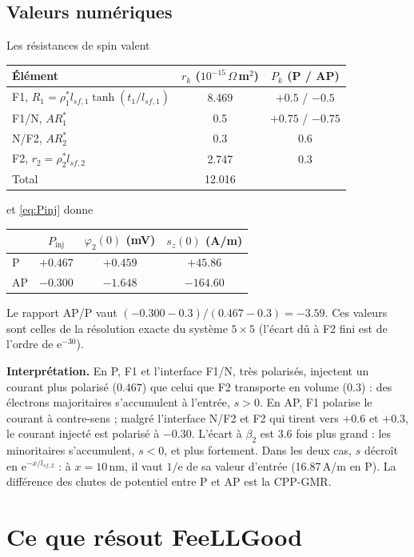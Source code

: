 \documentclass[11pt,a4paper]{article}
\newcommand{\ee}{\mathrm{e}}
\begin{document}
\subsection{Valeurs numériques}

Les résistances de spin valent
\begin{center}
\begin{tabular}{lcc}
  \toprule
  Élément & $r_k$ ($10^{-15}\,\Omega\,$m$^2$) & $P_k$ (P / AP) \\
  \midrule
  F1, $R_1 = \rho_1^*l_{sf,1}\tanh(t_1/l_{sf,1})$ & 8.469 & $+0.5$ / $-0.5$ \\
  F1/N, $AR_1^*$ & 0.5 & $+0.75$ / $-0.75$ \\
  N/F2, $AR_2^*$ & 0.3 & 0.6 \\
  F2, $r_2 = \rho_2^*l_{sf,2}$ & 2.747 & 0.3 \\
  \midrule
  Total & 12.016 & \\
  \bottomrule
\end{tabular}
\end{center}
et \eqref{eq:Pinj} donne
\begin{center}
\renewcommand{\arraystretch}{1.2}
\begin{tabular}{lccc}
  \toprule
  & $P_{\mathrm{inj}}$ & $\varphi_2(0)$ (mV) & $s_z(0)$ (A/m) \\
  \midrule
  P  & $+0.467$ & $+0.459$ & $+45.86$ \\
  AP & $-0.300$ & $-1.648$ & $-164.60$ \\
  \bottomrule
\end{tabular}
\end{center}
Le rapport AP/P vaut $(-0.300-0.3)/(0.467-0.3) = -3.59$. Ces valeurs
sont celles de la résolution exacte du système $5\times5$ (l'écart dû à
F2 fini est de l'ordre de $\ee^{-30}$).

\textbf{Interprétation.} En P, F1 et l'interface F1/N, très polarisés,
injectent un courant plus polarisé ($0.467$) que celui que F2 transporte
en volume ($0.3$) : des électrons majoritaires s'accumulent à l'entrée,
$s>0$. En AP, F1 polarise le courant à contre-sens ; malgré l'interface
N/F2 et F2 qui tirent vers $+0.6$ et $+0.3$, le courant injecté est
polarisé à $-0.30$. L'écart à $\beta_2$ est 3.6 fois plus grand : les
minoritaires s'accumulent, $s<0$, et plus fortement. Dans les deux cas,
$s$ décroît en $\ee^{-x/l_{sf,2}}$ : à $x = 10$\,nm, il vaut $1/\ee$ de sa
valeur d'entrée (16.87\,A/m en P). La différence des chutes de potentiel
entre P et AP est la CPP-GMR.

\section{Ce que résout FeeLLGood}
\end{document}
